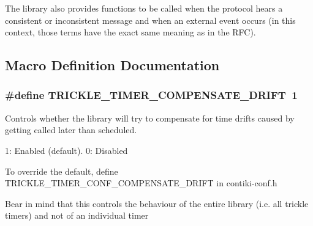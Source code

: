 The library also provides functions to be called when the protocol hears a \textquotesingle{}consistent\textquotesingle{} or \textquotesingle{}inconsistent\textquotesingle{} message and when an \textquotesingle{}external event\textquotesingle{} occurs (in this context, those terms have the exact same meaning as in the R\+F\+C). 

\subsection{Macro Definition Documentation}
\hypertarget{group__trickle-timer_ga361fa866c3bba8e5a05de3b957bc04c1}{}
\subsubsection[{T\+R\+I\+C\+K\+L\+E\+\_\+\+T\+I\+M\+E\+R\+\_\+\+C\+O\+M\+P\+E\+N\+S\+A\+T\+E\+\_\+\+D\+R\+I\+F\+T}]{\setlength{\rightskip}{0pt plus 5cm}\#define T\+R\+I\+C\+K\+L\+E\+\_\+\+T\+I\+M\+E\+R\+\_\+\+C\+O\+M\+P\+E\+N\+S\+A\+T\+E\+\_\+\+D\+R\+I\+F\+T~1}\label{group__trickle-timer_ga361fa866c3bba8e5a05de3b957bc04c1}


Controls whether the library will try to compensate for time drifts caused by getting called later than scheduled. 

1\+: Enabled (default). 0\+: Disabled

To override the default, define T\+R\+I\+C\+K\+L\+E\+\_\+\+T\+I\+M\+E\+R\+\_\+\+C\+O\+N\+F\+\_\+\+C\+O\+M\+P\+E\+N\+S\+A\+T\+E\+\_\+\+D\+R\+I\+F\+T in contiki-\/conf.\+h

Bear in mind that this controls the behaviour of the entire library (i.\+e. all trickle timers) and not of an individual timer \hypertarget{group__trickle-timer_gad47a05440295b6f171873f5f43384e56}{}

